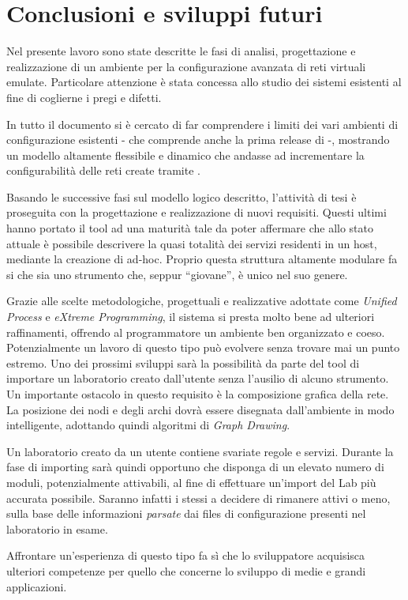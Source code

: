 \chapter*{Conclusioni e sviluppi futuri}

Nel presente lavoro sono state descritte le fasi di analisi, progettazione e realizzazione di un ambiente per la configurazione avanzata di reti virtuali emulate. Particolare attenzione è stata concessa allo studio dei sistemi esistenti al fine di coglierne i pregi e difetti.

In tutto il documento si è cercato di far comprendere i limiti dei vari ambienti di configurazione esistenti - che comprende anche la prima release di \visualnetkit{} -, mostrando un modello altamente flessibile e dinamico che andasse ad incrementare la configurabilità delle reti create tramite \visualnetkit{}.

Basando le successive fasi sul modello logico descritto, l'attività di tesi è proseguita con la progettazione e realizzazione di nuovi requisiti. Questi ultimi hanno portato il tool ad una maturità tale da poter affermare che allo stato attuale è possibile descrivere la quasi totalità dei servizi residenti in un host, mediante la creazione di \plugin{} ad-hoc. Proprio questa struttura altamente modulare fa si che \visualnetkit{} sia uno strumento che, seppur ``giovane'', è unico nel suo genere.

Grazie alle scelte metodologiche, progettuali e realizzative adottate come \emph{Unified Process} e \emph{eXtreme Programming}, il sistema si presta molto bene ad ulteriori raffinamenti, offrendo al programmatore un ambiente ben organizzato e coeso. Potenzialmente un lavoro di questo tipo può evolvere senza trovare mai un punto estremo. Uno dei prossimi sviluppi sarà la possibilità da parte del tool di importare un laboratorio creato dall'utente senza l'ausilio di alcuno strumento.
Un importante ostacolo in questo requisito è la composizione grafica della rete. La posizione dei nodi e degli archi dovrà essere disegnata dall'ambiente in modo intelligente, adottando quindi algoritmi di \emph{Graph Drawing}.

Un laboratorio creato da un utente contiene svariate regole e servizi. Durante la fase di importing sarà quindi opportuno che \visualnetkit{} disponga di un elevato numero di moduli, potenzialmente attivabili, al fine di effettuare un'import del Lab più accurata possibile. Saranno infatti i \plugin{} stessi a decidere di rimanere attivi o meno, sulla base delle informazioni \emph{parsate} dai files di configurazione presenti nel laboratorio in esame.

Affrontare un'esperienza di questo tipo fa sì che lo sviluppatore acquisisca ulteriori competenze per quello che concerne lo sviluppo di medie e grandi applicazioni.